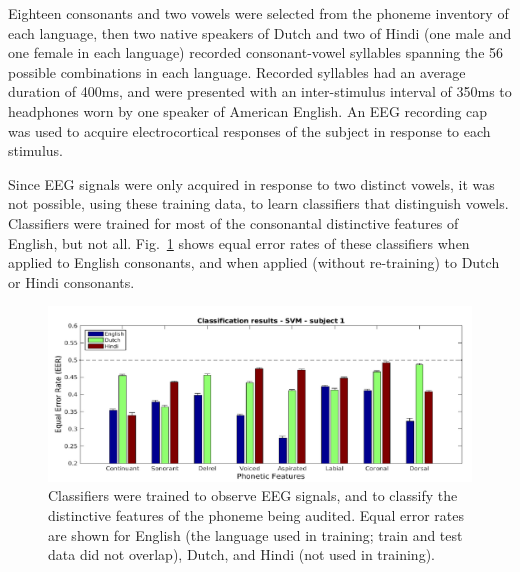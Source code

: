 Eighteen consonants and two vowels were selected from the phoneme
inventory of each language, then two native speakers of Dutch and two
of Hindi (one male and one female in each language) recorded
consonant-vowel syllables spanning the 56 possible combinations in
each language.  Recorded syllables had an average duration of 400ms,
and were presented with an inter-stimulus interval of 350ms to
headphones worn by one speaker of American English.  An EEG recording
cap was used to acquire electrocortical responses of the subject in
response to each stimulus.

Since EEG signals were only acquired in response to two distinct
vowels, it was not possible, using these training data, to learn
classifiers that distinguish vowels.  Classifiers were trained for
most of the consonantal distinctive features of English, but not all.
Fig.~\ref{fig:eeg_svm_eers} shows equal error rates of these
classifiers when applied to English consonants, and when applied
(without re-training) to Dutch or Hindi consonants.

\begin{figure}
  \centerline{\includegraphics[width=5in]{../figs/diliberto_svmresults.png}}
  \caption{Classifiers were trained to observe EEG signals, and to
    classify the distinctive features of the phoneme being audited.
    Equal error rates are shown for English (the language used in
    training; train and test data did not overlap), Dutch, and Hindi
    (not used in training).}
  \label{fig:eeg_svm_eers}
\end{figure}

